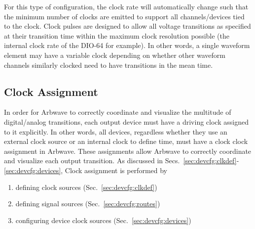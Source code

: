 For this type of configuration, the clock rate will automatically change such
that the minimum number of clocks are emitted to support all channels/devices
tied to the clock.  Clock pulses are designed to allow all voltage transitions
as specified at their transition time within the maximum clock resolution
possible (the internal clock rate of the DIO-64 for example).  In other words, a
single waveform element may have a variable clock depending on whether other
waveform channels similarly clocked need to have transitions in the mean time.


\subsection{Clock Assignment}
In order for Arbwave to correctly coordinate and visualize the multitude of
digital/analog transitions, each output device must have a driving clock
assigned to it explicitly.  In other words, all devices, regardless whether they
use an external clock source or an internal clock to define time, must have a
clock clock assignment in Arbwave.  These assignments allow Arbwave to correctly
coordinate and visualize each output transition.  As discussed in
Secs.~\ref{sec:devcfg:clkdef}-\ref{sec:devcfg:devices}, Clock assignment is
performed by
%
\begin{enumerate}
  \item defining clock sources (Sec.~\ref{sec:devcfg:clkdef})
  \item defining signal sources (Sec.~\ref{sec:devcfg:routes})
  \item configuring device clock sources (Sec.~\ref{sec:devcfg:devices})
\end{enumerate}


